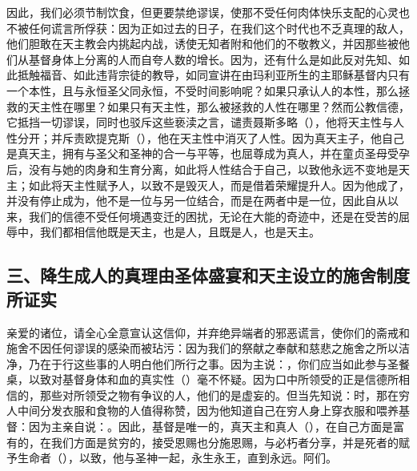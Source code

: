 因此，我们必须节制饮食，但更要禁绝谬误，使那不受任何肉体快乐支配的心灵也不被任何谎言所俘获：因为正如过去的日子，在我们这个时代也不乏真理的敌人，他们胆敢在天主教会内挑起内战，诱使无知者附和他们的不敬教义，并因那些被他们从基督身体上分离的人而自夸人数的增长。因为，还有什么是如此反对先知、如此抵触福音、如此违背宗徒的教导，如同宣讲在由玛利亚所生的主耶稣基督内只有一个本性，且与永恒圣父同永恒，不受时间影响呢？如果只承认人的本性，那么拯救的天主性在哪里？如果只有天主性，那么被拯救的人性在哪里？然而公教信德，它抵挡一切谬误，同时也驳斥这些亵渎之言，谴责聂斯多略（），他将天主性与人性分开；并斥责欧提克斯（），他在天主性中消灭了人性。因为真天主子，他自己是真天主，拥有与圣父和圣神的合一与平等，也屈尊成为真人，并在童贞圣母受孕后，没有与她的肉身和生育分离，如此将人性结合于自己，以致他永远不变地是天主；如此将天主性赋予人，以致不是毁灭人，而是借着荣耀提升人。因为他成了，并没有停止成为，他不是一位与另一位结合，而是在两者中是一位，因此自从以来，我们的信德不受任何境遇变迁的困扰，无论在大能的奇迹中，还是在受苦的屈辱中，我们都相信他既是天主，也是人，且既是人，也是天主。\par


\subsection{三、降生成人的真理由圣体盛宴和天主设立的施舍制度所证实}

亲爱的诸位，请全心全意宣认这信仰，并弃绝异端者的邪恶谎言，使你们的斋戒和施舍不因任何谬误的感染而被玷污：因为我们的祭献之奉献和慈悲之施舍之所以洁净，乃在于行这些事的人明白他们所行之事。因为主说：，你们应当如此参与圣餐桌，以致对基督身体和血的真实性（）毫不怀疑。因为口中所领受的正是信德所相信的，那些对所领受之物有争议的人，他们的是虚妄的。但当先知说：时，那在穷人中间分发衣服和食物的人值得称赞，因为他知道自己在穷人身上穿衣服和喂养基督：因为主亲自说：。因此，基督是唯一的，真天主和真人（），在自己方面是富有的，在我们方面是贫穷的，接受恩赐也分施恩赐，与必朽者分享，并是死者的赋予生命者（），以致，他与圣神一起，永生永王，直到永远。阿们。\par

